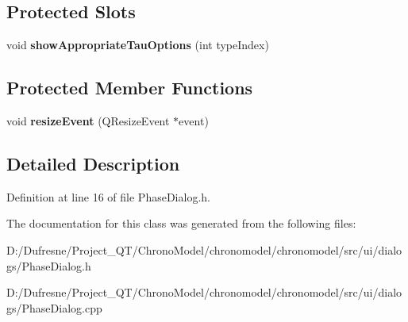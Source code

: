 \subsection*{Protected Slots}
\begin{DoxyCompactItemize}
\item 
\hypertarget{class_phase_dialog_a4abe57fd14a623289fa8fc90a511df8d}{void {\bfseries show\-Appropriate\-Tau\-Options} (int type\-Index)}\label{class_phase_dialog_a4abe57fd14a623289fa8fc90a511df8d}

\end{DoxyCompactItemize}
\subsection*{Protected Member Functions}
\begin{DoxyCompactItemize}
\item 
\hypertarget{class_phase_dialog_a942a4a1f8e999e4449e3a4307ebe97ae}{void {\bfseries resize\-Event} (Q\-Resize\-Event $\ast$event)}\label{class_phase_dialog_a942a4a1f8e999e4449e3a4307ebe97ae}

\end{DoxyCompactItemize}


\subsection{Detailed Description}


Definition at line 16 of file Phase\-Dialog.\-h.



The documentation for this class was generated from the following files\-:\begin{DoxyCompactItemize}
\item 
D\-:/\-Dufresne/\-Project\-\_\-\-Q\-T/\-Chrono\-Model/chronomodel/chronomodel/src/ui/dialogs/Phase\-Dialog.\-h\item 
D\-:/\-Dufresne/\-Project\-\_\-\-Q\-T/\-Chrono\-Model/chronomodel/chronomodel/src/ui/dialogs/Phase\-Dialog.\-cpp\end{DoxyCompactItemize}
